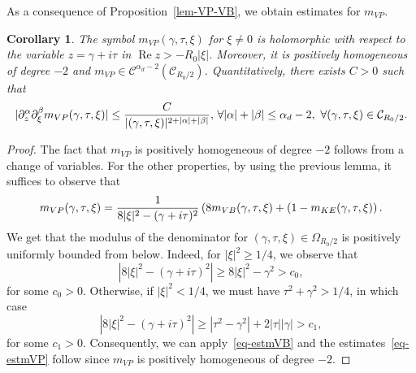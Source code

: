 \documentclass[11pt]{amsart}
\numberwithin{equation}{section}
\newtheorem{coro}{Corollary}[section]
\begin{document}
As a consequence of Proposition~\ref{lem-VP-VB}, we obtain estimates for $m_{VP}$. 
   \begin{coro}
   \label{lem-symbolVP-sphere}
   The symbol $m_{VP}(\gamma, \tau, \xi)$ 
 for $\xi \neq 0$ is holomorphic with respect to the variable $z= \gamma + i \tau$ in $\operatorname{Re} z > - R_{0} | \xi|$.
  Moreover,  it 
is  positively homogeneous of degree  $-2$ and $m_{VP} \in \mathscr{C}^{\alpha_d - 2}(\mathcal{C}_{R_{0}/2})$.
 Quantitatively, there exists $C>0$ such that 
   \begin{equation}
   \label{eq-estmVP}| \partial_{z}^\alpha \partial_{\xi}^\beta m_{VP}(\gamma, \tau, \xi) | 
    \leq {C \over |(\gamma, \tau, \xi) |^{2 +|\alpha |+ |\beta|}}, \, \forall   | \alpha| + |\beta | \leq  \alpha_d - 2,\,  \, \forall (\gamma, \tau, \xi) \in \mathcal{C}_{R_{0}/2}.
    \end{equation}

   
   
    \end{coro}

 

\begin{proof}
The fact that $m_{VP}$ is positively homogeneous of degree $-2$ follows from a change of variables.
For the other properties, by using the previous lemma, it suffices to observe that
  \begin{equation}
  \label{mVPbig}   m_{VP}(\gamma, \tau, \xi)=  { 1  \over 8   |\xi|^2 - ( \gamma + i \tau )^2} \left( 8 m_{VB}(\gamma, \tau, \xi) + ( 1 - m_{KE}(\gamma, \tau, \xi) \right).
  \end{equation}
   We get  that  the modulus of the denominator  for $(\gamma, \tau, \xi)
      \in \Omega_{R_{0}/2}$ is positively  uniformly bounded from below. Indeed, for $|\xi|^2\geq 1/4$, we observe that 
$$
     \left| 8 |\xi|^2 - ( \gamma + i \tau )^2  \right| \geq 8 | \xi|^2 - \gamma^2
    >c_0,  $$
    for some $c_0>0$.
    Otherwise, if $|\xi|^2< 1/4$, we must have $\tau^2 + \gamma^2> 1/4$, in which case 
    $$
     \left| 8 |\xi|^2 - ( \gamma + i \tau )^2  \right| \geq |\tau^2- \gamma^2|  + 2 |\tau| |\gamma| 
    >c_1,   $$
    for some $c_1>0$.
   Consequently, we can apply~\eqref{eq-estmVB} and the estimates~\eqref{eq-estmVP} follow since $m_{VP}$ is  positively homogeneous of degree $-2$.
\end{proof}
\end{document}
